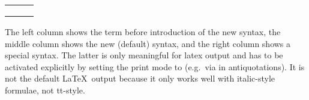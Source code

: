 \begin{isabellebody}
\begin{isamarkuptext}
\begin{center}
\begin{tabular}{lll}
\isa{{\isachardoublequote}{\kern0pt}{\isasymSum}x{\isasymin}{\isacharbraceleft}{\kern0pt}a{\isachardot}{\kern0pt}{\isachardot}{\kern0pt}{\isacharless}{\kern0pt}b{\isacharbraceright}{\kern0pt}{\isachardot}{\kern0pt}\ e{\isachardoublequote}{\kern0pt}} & \isa{{\isasymSum}x\ {\isacharequal}{\kern0pt}\ a{\isachardot}{\kern0pt}{\isachardot}{\kern0pt}{\isacharless}{\kern0pt}b{\isachardot}{\kern0pt}\ e} & \isa{$\sum_{x\ {\isacharequal}{\kern0pt}\ a}^{<b}$\ e}\\
\isa{{\isachardoublequote}{\kern0pt}{\isasymSum}x{\isasymin}{\isacharbraceleft}{\kern0pt}{\isachardot}{\kern0pt}{\isachardot}{\kern0pt}b{\isacharbraceright}{\kern0pt}{\isachardot}{\kern0pt}\ e{\isachardoublequote}{\kern0pt}} & \isa{{\isasymSum}x{\isasymle}b{\isachardot}{\kern0pt}\ e} & \isa{$\sum_{x\ {\isasymle}\ b}$\ e}\\
\isa{{\isachardoublequote}{\kern0pt}{\isasymSum}x{\isasymin}{\isacharbraceleft}{\kern0pt}{\isachardot}{\kern0pt}{\isachardot}{\kern0pt}{\isacharless}{\kern0pt}b{\isacharbraceright}{\kern0pt}{\isachardot}{\kern0pt}\ e{\isachardoublequote}{\kern0pt}} & \isa{{\isasymSum}x{\isacharless}{\kern0pt}b{\isachardot}{\kern0pt}\ e} & \isa{$\sum_{x\ {\isacharless}{\kern0pt}\ b}$\ e}
\end{tabular}
\end{center}
The left column shows the term before introduction of the new syntax,
the middle column shows the new (default) syntax, and the right column
shows a special syntax. The latter is only meaningful for latex output
and has to be activated explicitly by setting the print mode to
 (e.g.\ via  in
antiquotations). It is not the default \LaTeX\ output because it only
works well with italic-style formulae, not tt-style.


\end{isamarkuptext}
\end{isabellebody}
